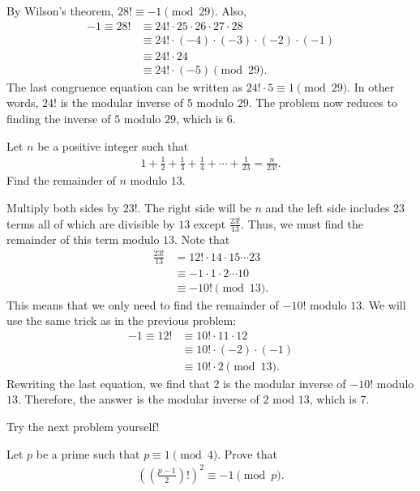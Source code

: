 \documentclass{subfile}
\begin{document}
		\begin{solution}
			By Wilson's theorem, $28! \equiv -1 \pmod{29}$. Also,
				\begin{align*}
					-1 \equiv 28! &\equiv 24! \cdot 25 \cdot 26 \cdot 27 \cdot 28\\
					    &\equiv 24! \cdot (-4) \cdot (-3) \cdot (-2) \cdot (-1)\\
					    &\equiv 24! \cdot 24\\
					    &\equiv 24! \cdot (-5)\pmod{29}.
				\end{align*}
			The last congruence equation can be written as $24! \cdot 5 \equiv 1 \pmod{29}$. In other words, $24!$ is the modular inverse of $5$ modulo $29$. The problem now reduces to finding the inverse of $5$ modulo $29$, which is $6$.
			
		\end{solution}
		
		\begin{problem}
			Let $n$ be a positive integer such that
				\begin{align*}
					1 + \frac{1}{2} + \frac{1}{3} + \frac{1}{4} +\cdots + \frac{1}{23} = \frac{n}{23!}.
				\end{align*}
			Find the remainder of $n$ modulo $13$.
		\end{problem}
		
		\begin{solution}
			Multiply both sides by $23!$. The right side will be $n$ and the left side includes $23$ terms all of which are divisible by $13$ except $\frac{23!}{13}$. Thus, we must find the remainder of this term modulo $13$. Note that
				\begin{align*}
					\frac{23!}{13} &= 12! \cdot 14 \cdot 15 \cdots 23\\
								   &\equiv -1 \cdot 1 \cdot 2 \cdots 10\\
								   &\equiv -10! \pmod{13}.
				\end{align*}
			This means that we only need to find the remainder of $-10!$ modulo $13$. We will use the same trick as in the previous problem:
				\begin{align*}
					-1 \equiv 12! &\equiv 10! \cdot 11 \cdot 12\\
						&\equiv 10! \cdot (-2) \cdot (-1)\\
						&\equiv 10! \cdot 2\pmod{13}.
				\end{align*}
			Rewriting the last equation, we find that $2$ is the modular inverse of $-10!$ modulo $13$. Therefore, the answer is the modular inverse of $2$ mod $13$, which is $7$.
		\end{solution}
	Try the next problem yourself!
		\begin{problem}
			Let $p$ be a prime such that $p \equiv 1 \pmod 4$. Prove that
				\begin{align*}
					\left(\left(\frac{p-1}{2}\right)!\right)^2 \equiv -1 \pmod p.
				\end{align*}
		\end{problem}
		
\end{document}
